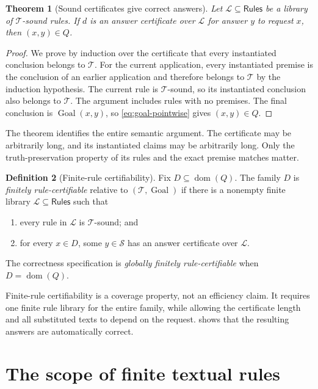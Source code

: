 \documentclass[11pt,twoside]{article}
\newtheorem{theorem}{Theorem}[section]
\theoremstyle{definition}
\newtheorem{definition}[theorem]{Definition}
\newcommand{\Stext}{\mathcal S}
\newcommand{\True}{\mathcal T}
\newcommand{\Lib}{\mathcal L}
\newcommand{\Rules}{\mathsf{Rules}}
\newcommand{\Goal}{\operatorname{Goal}}
\newcommand{\dom}{\operatorname{dom}}
\begin{document}
\begin{theorem}[Sound certificates give correct answers]
\label{thm:certificate-soundness}
Let $\Lib\subseteq\Rules$ be a library of $\True$-sound rules. If $d$ is an
answer certificate over $\Lib$ for answer $y$ to request $x$, then
$(x,y)\in Q$.
\end{theorem}
\begin{proof}
We prove by induction over the certificate that every instantiated conclusion
belongs to $\True$. For the current application, every instantiated premise
is the conclusion of an earlier application and therefore belongs to $\True$
by the induction hypothesis. The current rule is $\True$-sound, so its
instantiated conclusion also belongs to $\True$. The argument includes rules
with no premises. The final conclusion is $\Goal(x,y)$, so
\cref{eq:goal-pointwise} gives $(x,y)\in Q$.
\end{proof}

The theorem identifies the entire semantic argument. The certificate may be
arbitrarily long, and its instantiated claims may be arbitrarily long. Only
the truth-preservation property of its rules and the exact premise matches
matter.

\begin{definition}[Finite-rule certifiability]
\label{def:finite-rule-certifiability}
Fix $D\subseteq\dom(Q)$. The family $D$ is \emph{finitely
rule-certifiable} relative to $(\True,\Goal)$ if there is a nonempty finite
library $\Lib\subseteq\Rules$ such that
\begin{enumerate}[label=(\roman*),leftmargin=*]
\item every rule in $\Lib$ is $\True$-sound; and
\item for every $x\in D$, some $y\in\Stext$ has an answer certificate over
$\Lib$.
\end{enumerate}
The correctness specification is \emph{globally finitely rule-certifiable}
when $D=\dom(Q)$.
\end{definition}

Finite-rule certifiability is a coverage property, not an efficiency claim.
It requires one finite rule library for the entire family, while allowing the
certificate length and all substituted texts to depend on the request.
 shows that the resulting answers are
automatically correct.

\section{The scope of finite textual rules}
\label{sec:finite-rule-scope}
\end{document}
